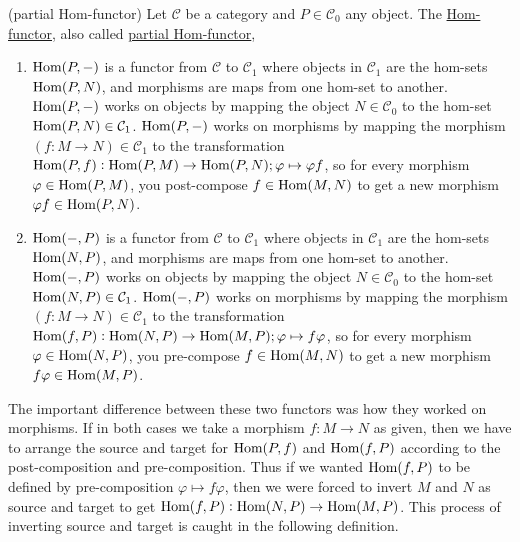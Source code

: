 \begin{example}{(partial Hom-functor)}\label{ex:hom_functor}
Let $\mathcal{C}$ be a category and $P \in \mathcal{C}_{0}$ any object. The \ul{Hom-functor}, also called \ul{partial Hom-functor},
\begin{enumerate}
\item $\textup{Hom}(P,-)$ is a functor from $\mathcal{C}$ to $\mathcal{C}_{1}$ where objects in $\mathcal{C}_{1}$ are the hom-sets 
$\textup{Hom}(P,N)$, and morphisms are maps from one hom-set to another.
$\textup{Hom}(P,-)$ works on objects by mapping the object $N \in \mathcal{C}_{0}$ to
the hom-set $\textup{Hom}(P,N) \in \mathcal{C}_{1}$.
$\textup{Hom}(P,-)$ works on morphisms by mapping the morphism $(f : M \rightarrow N ) \in \mathcal{C}_{1}$ to the transformation
$\textup{Hom}(P,f) : \textup{Hom}(P,M) \rightarrow \textup{Hom}(P,N); \varphi \mapsto \varphi f$, so for every morphism
$\varphi \in \textup{Hom}(P,M)$, you post-compose $f \in \textup{Hom}(M,N)$ to get a new morphism $\varphi f \in \textup{Hom}(P,N)$.

\item $\textup{Hom}(-,P)$ is a functor from $\mathcal{C}$ to $\mathcal{C}_{1}$ where objects in $\mathcal{C}_{1}$ are the hom-sets 
$\textup{Hom}(N,P)$, and morphisms are maps from one hom-set to another.
$\textup{Hom}(-,P)$ works on objects by mapping the object $N \in \mathcal{C}_{0}$ to
the hom-set $\textup{Hom}(N,P) \in \mathcal{C}_{1}$.
$\textup{Hom}(-,P)$ works on morphisms by mapping the morphism $(f : M \rightarrow N ) \in \mathcal{C}_{1}$ to the transformation
$\textup{Hom}(f,P) : \textup{Hom}(N,P) \rightarrow \textup{Hom}(M,P); \varphi \mapsto f\varphi$, so for every morphism
$\varphi \in \textup{Hom}(N,P)$, you pre-compose $f \in \textup{Hom}(M,N)$ to get a new morphism $f\varphi \in \textup{Hom}(M,P)$.
\end{enumerate}

The important difference between these two functors was how they worked on morphisms. If in both cases we take a morphism
$f : M \rightarrow N$ as given, then we have to arrange the source and target for $\textup{Hom}(P,f)$ and $\textup{Hom}(f,P)$
according to the post-composition and pre-composition. Thus if we wanted $\textup{Hom}(f,P)$ to be defined by pre-composition
$\varphi \mapsto f\varphi$, then we were forced to invert $M$ and $N$ as source and target to get 
$\textup{Hom}(f,P): \textup{Hom}(N,P) \rightarrow \textup{Hom}(M,P)$. 
This process of inverting source and target is caught in the following definition.
\end{example}

